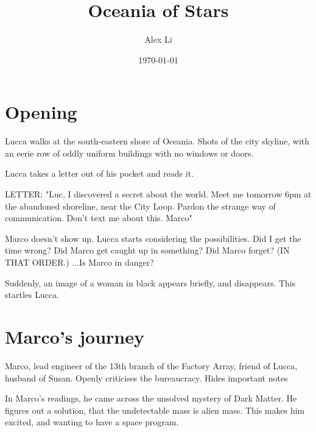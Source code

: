 \documentclass[11pt]{article}
\begin{document}
\begin{titlepage}
\title{Oceania of Stars}
\author{Alex Li}
\date{\today} %
\maketitle
\thispagestyle{empty} %
\end{titlepage}



\tableofcontents
\newpage %






\section{Opening}

Lucca walks at the south-eastern shore of Oceania. Shots of the city skyline, with an eerie row of oddly uniform buildings with no windows or doors. 

Lucca takes a letter out of his pocket and reads it.

LETTER: "Luc, I discovered a secret about the world. 
Meet me tomorrow 6pm at the abandoned shoreline, near the City Loop. 
Pardon the strange way of communication. 
Don't text me about this. 
Marco"

Marco doesn't show up. Lucca starts considering the possibilities. Did I get the time wrong? Did Marco get caught up in something? Did Marco forget? (IN THAT ORDER.) ...Is Marco in danger?

Suddenly, an image of a woman in black appears briefly, and disappears. This startles Lucca. 






\section{Marco's journey}
Marco, lead engineer of the 13th branch of the Factory Array, friend of Lucca, husband of Susan. Openly criticises the bureaucracy. Hides important notes 

In Marco's readings, he came across the unsolved mystery of Dark Matter. He figures out a solution, that the undetectable mass is alien mass. This makes him excited, and wanting to have a space program.
\end{document}
